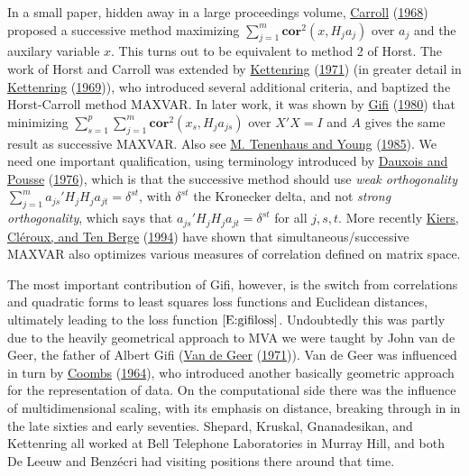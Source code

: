 \documentclass[
  12pt,
]{book}
\begin{document}
In a small paper, hidden away in a large proceedings volume, \protect\hyperlink{ref-carroll_68}{Carroll} (\protect\hyperlink{ref-carroll_68}{1968}) proposed a successive method maximizing
\(\sum_{j=1}^m\mathbf{cor}^2(x,H_ja_j)\) over \(a_j\) and the auxilary variable \(x\). This turns out to be equivalent to method 2 of Horst. The work of Horst and Carroll was extended by \protect\hyperlink{ref-kettenring_71}{Kettenring} (\protect\hyperlink{ref-kettenring_71}{1971}) (in greater detail in \protect\hyperlink{ref-kettenring_69}{Kettenring} (\protect\hyperlink{ref-kettenring_69}{1969})), who introduced several additional criteria, and baptized the Horst-Carroll method MAXVAR. In later work, it was shown by \protect\hyperlink{ref-gifi_B_80}{Gifi} (\protect\hyperlink{ref-gifi_B_80}{1980}) that minimizing \(\sum_{s=1}^p\sum_{j=1}^m\mathbf{cor}^2(x_s,H_ja_{js})\) over
\(X'X=I\) and \(A\) gives the same result as successive MAXVAR. Also see \protect\hyperlink{ref-tenenhaus_young_85}{M. Tenenhaus and Young} (\protect\hyperlink{ref-tenenhaus_young_85}{1985}). We need one important qualification, using terminology introduced by \protect\hyperlink{ref-dauxois_pousse_76}{Dauxois and Pousse} (\protect\hyperlink{ref-dauxois_pousse_76}{1976}), which is that the successive method should use \emph{weak orthogonality} \(\sum_{j=1}^m a_{js}'H_jH_ja_{jt}=\delta^{st}\), with \(\delta^{st}\) the Kronecker delta, and not \emph{strong orthogonality}, which says that \(a_{js}'H_jH_ja_{jt}=\delta^{st}\) for all \(j,s,t\). More recently
\protect\hyperlink{ref-kiers_cleroux_tenberge_94}{Kiers, Cléroux, and Ten Berge} (\protect\hyperlink{ref-kiers_cleroux_tenberge_94}{1994}) have shown that simultaneous/successive MAXVAR also optimizes various measures of correlation defined on matrix space.

The most important contribution of Gifi, however, is the switch from correlations and quadratic forms to least squares loss functions and Euclidean distances, ultimately leading to the loss function \(\eqref{E:gifiloss}\). Undoubtedly this was partly due to the heavily geometrical approach to MVA we were taught by John van de Geer, the father of Albert Gifi (\protect\hyperlink{ref-vandegeer_71}{Van de Geer} (\protect\hyperlink{ref-vandegeer_71}{1971})). Van de Geer was influenced in turn by
\protect\hyperlink{ref-coombs_64}{Coombs} (\protect\hyperlink{ref-coombs_64}{1964}), who introduced another basically geometric approach for the representation of data. On the computational side there was the influence of multidimensional scaling, with its emphasis on distance, breaking through in in the late sixties and early seventies.
Shepard, Kruskal, Gnanadesikan, and Kettenring all worked at Bell Telephone Laboratories in Murray Hill, and both De Leeuw and Benzécri had visiting positions there around that time.
\end{document}
